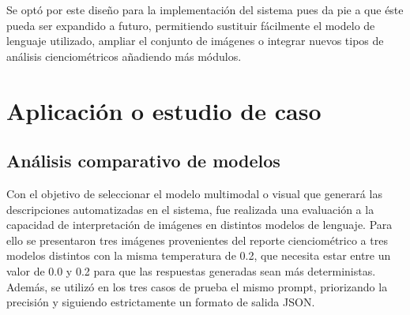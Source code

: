 \documentclass[letterpaper,spanish,12pt]{book}
\begin{document}




    \noindent Se optó por este diseño para la implementación del sistema pues da pie a que éste pueda ser expandido a futuro, permitiendo sustituir fácilmente el modelo de lenguaje utilizado, ampliar el conjunto de imágenes o integrar nuevos tipos de análisis cienciométricos añadiendo más módulos.
    
\chapter{Aplicación o estudio de caso}
    \section{Análisis comparativo de modelos} 

    Con el objetivo de seleccionar el modelo multimodal o visual que generará las descripciones automatizadas en el sistema, fue realizada una evaluación a la capacidad de interpretación de imágenes en distintos modelos de lenguaje. Para ello se presentaron tres imágenes provenientes del reporte cienciométrico a tres modelos distintos con la misma temperatura de 0.2, que necesita estar entre un valor de 0.0 y 0.2 para que las respuestas generadas sean más deterministas. Además, se utilizó en los tres casos de prueba el mismo prompt, priorizando la precisión y siguiendo estrictamente un formato de salida JSON. \\
\end{document}
